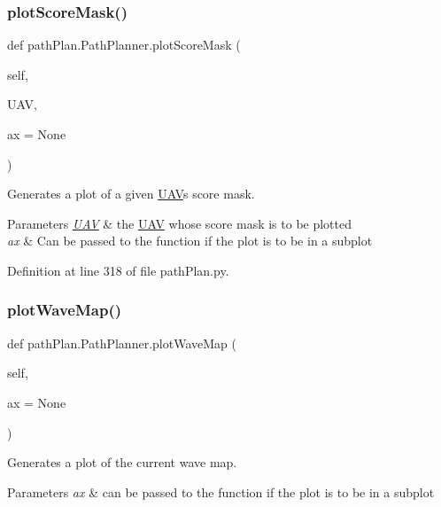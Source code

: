 \subsubsection{\texorpdfstring{plot\+Score\+Mask()}{plotScoreMask()}}
{\footnotesize\ttfamily def path\+Plan.\+Path\+Planner.\+plot\+Score\+Mask (\begin{DoxyParamCaption}\item[{}]{self,  }\item[{}]{U\+AV,  }\item[{}]{ax = {\ttfamily None} }\end{DoxyParamCaption})}



Generates a plot of a given \mbox{\hyperlink{classpath_plan_1_1_u_a_v}{U\+AV}}\textquotesingle{}s score mask. 


\begin{DoxyParams}{Parameters}
{\em \mbox{\hyperlink{classpath_plan_1_1_u_a_v}{U\+AV}}} & the \mbox{\hyperlink{classpath_plan_1_1_u_a_v}{U\+AV}} whose score mask is to be plotted \\
\hline
{\em ax} & Can be passed to the function if the plot is to be in a subplot \\
\hline
\end{DoxyParams}


Definition at line 318 of file path\+Plan.\+py.

\mbox{\label{classpath_plan_1_1_path_planner_ad0aac3259a17970adbb7652d32365f44}} 
\subsubsection{\texorpdfstring{plot\+Wave\+Map()}{plotWaveMap()}}
{\footnotesize\ttfamily def path\+Plan.\+Path\+Planner.\+plot\+Wave\+Map (\begin{DoxyParamCaption}\item[{}]{self,  }\item[{}]{ax = {\ttfamily None} }\end{DoxyParamCaption})}



Generates a plot of the current wave map. 


\begin{DoxyParams}{Parameters}
{\em ax} & can be passed to the function if the plot is to be in a subplot \\
\hline
\end{DoxyParams}


